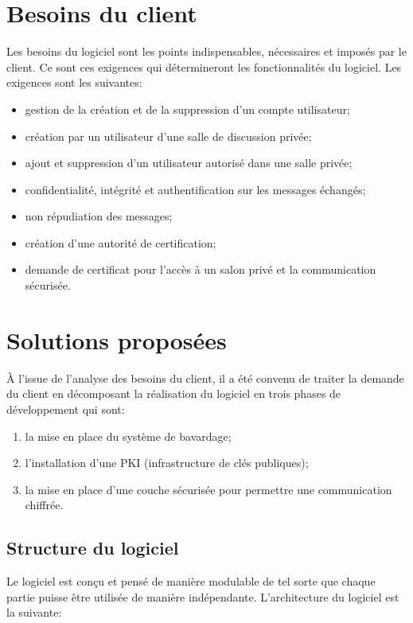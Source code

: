 \documentclass[a4paper,11pt,french]{book}
\begin{document}
\section{Besoins du client}
Les besoins du logiciel sont les points indispensables, nécessaires et imposés par le client. Ce sont ces exigences qui détermineront les fonctionnalités du logiciel. Les exigences sont les suivantes:
\vspace{.5cm}
\begin{itemize}\item gestion de la création et de la suppression d’un compte utilisateur;\item création par un utilisateur d’une salle de discussion privée;\item ajout et suppression d’un utilisateur autorisé dans une salle privée;\item confidentialité, intégrité et authentification sur les messages échangés;\item non répudiation des messages;\item création d’une autorité de certification;\item demande de certificat pour l’accès à un salon privé et la communication sécurisée.\end{itemize}

\section{Solutions proposées}
\`A l'issue de l'analyse des besoins du client, il a été convenu de traiter la demande du client en décomposant la réalisation du logiciel en trois phases de développement qui sont:
\begin{enumerate}\item la mise en place du système de bavardage;\item l'installation d'une PKI (infrastructure de clés publiques);\item la mise en place d'une couche sécurisée pour permettre une communication chiffrée.\end{enumerate}
\vspace{.5cm}

\subsection{Structure du logiciel}
Le logiciel est conçu et pensé de manière modulable de tel sorte que chaque partie puisse \^etre utilisée de manière indépendante. L'architecture du logiciel est la suivante:\\
\end{document}
